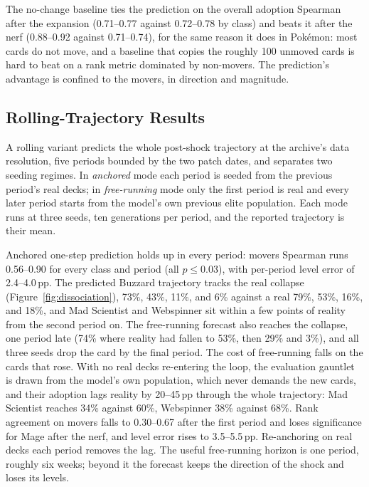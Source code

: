 \documentclass[journal]{IEEEtran}
\newcommand{\pp}{\,\text{pp}}
\newcommand{\pkmn}{Pok\'emon}
\begin{document}
The no-change baseline ties the prediction on the overall adoption
Spearman after the expansion (0.71--0.77 against 0.72--0.78 by class)
and beats it after the nerf (0.88--0.92 against 0.71--0.74), for the
same reason it does in \pkmn{}: most cards do not move, and a baseline
that copies the roughly 100 unmoved cards is hard to beat on a rank
metric dominated by non-movers. The prediction's advantage is confined
to the movers, in direction and magnitude.

\subsection{Rolling-Trajectory Results}
\label{sec:hsrolling}

A rolling variant predicts the whole post-shock trajectory at the
archive's data resolution, five periods bounded by the two patch dates,
and separates two seeding regimes. In \emph{anchored} mode each period is
seeded from the previous period's real decks; in \emph{free-running} mode
only the first period is real and every later period starts from the
model's own previous elite population. Each mode runs at three seeds, ten
generations per period, and the reported trajectory is their mean.

Anchored one-step prediction holds up in every period: movers Spearman
runs 0.56--0.90 for every class and period (all $p\le0.03$), with
per-period level error of 2.4--4.0$\pp$. The predicted Buzzard trajectory
tracks the real collapse (Figure~\ref{fig:dissociation}), 73\%, 43\%,
11\%, and 6\% against a real 79\%, 53\%, 16\%, and 18\%, and Mad
Scientist and Webspinner sit within a few points of reality from the
second period on. The free-running forecast also reaches the collapse,
one period late (74\% where reality had fallen to 53\%, then 29\% and
3\%), and all three seeds drop the card by the final period. The cost of
free-running falls on the cards that rose. With no real decks re-entering
the loop, the evaluation gauntlet is drawn from the model's own
population, which never demands the new cards, and their adoption lags
reality by 20--45$\pp$ through the whole trajectory: Mad Scientist
reaches 34\% against 60\%, Webspinner 38\% against 68\%. Rank agreement
on movers falls to 0.30--0.67 after the first period and loses
significance for Mage after the nerf, and level error rises to
3.5--5.5$\pp$. Re-anchoring on real decks each period removes the lag.
The useful free-running horizon is one period, roughly six weeks; beyond
it the forecast keeps the direction of the shock and loses its levels.
\end{document}

